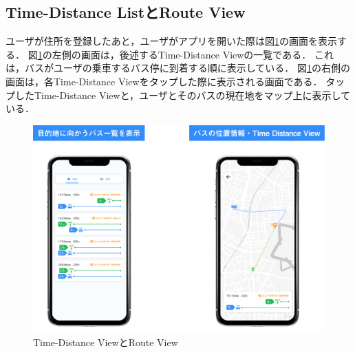 \subsection{Time-Distance ListとRoute View}
    ユーザが住所を登録したあと，ユーザがアプリを開いた際は図\ref{fig:feature_td}の画面を表示する．
    図\ref{fig:feature_td}の左側の画面は，後述するTime-Distance Viewの一覧である．
    これは，バスがユーザの乗車するバス停に到着する順に表示している．
    図\ref{fig:feature_td}の右側の画面は，各Time-Distance Viewをタップした際に表示される画面である．
    タップしたTime-Distance Viewと，ユーザとそのバスの現在地をマップ上に表示している．
    \pagebreak
    \begin{figure}
        \centering
        \includegraphics[width=14cm]{images/feature_td.png}
        \caption{Time-Distance ViewとRoute View}
        \label{fig:feature_td}
    \end{figure}
